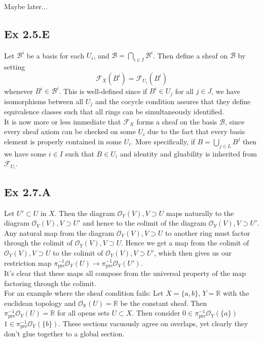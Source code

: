 \documentclass{article}
\theoremstyle{definition}
\newcommand{\R}{\mathbb{R}}
\begin{document}
Maybe later...

\subsection*{Ex 2.5.E}

Let $\mathcal{B}^i$ be a basis for each $U_i$, and $\mathcal{B} = \bigcap_{i
		\in I} \mathcal{B}^i$. Then define a sheaf on $\mathcal{B}$ by setting
\[
	\mathcal{F}_X(B^i) = \mathcal{F}_{U_i}(B^i)
\]
whenever $B^i \in \mathcal{B}^i$. This is well-defined since if $B^i \in U_j$
for all $j \in J$, we have isomorphisms between all $U_j$ and the cocycle
condition assures that they define equivalence classes such that all rings can
be simultaneously identified. \\

It is now more or less immediate that $\mathcal{F}_X$ forms a sheaf on the
basis $\mathcal{B}$, since every sheaf axiom can be checked on some $U_i$ due
to the fact that every basis element is properly contained in some $U_i$. More
specifically, if $B = \bigcup_{j \in L} B^j$ then we have some $i \in I$ such
that $B \in U_i$ and identity and gluability is inherited from
$\mathcal{F}_{U_i}$.


\subsection*{Ex 2.7.A}

Let $U' \subset U$ in $X$. Then the diagram $\mathcal{O}_Y(V), V \supset U$
maps naturally to the diagram $\mathcal{O}_Y(V), V \supset U'$ and hence to the
colimit of the diagram $\mathcal{O}_Y(V), V \supset U'$. Any natural map from
the diagram $\mathcal{O}_Y(V), V \supset U$ to another ring must factor through
the colimit of $\mathcal{O}_Y(V), V \supset U$. Hence we get a map from the
colimit of $\mathcal{O}_Y(V), V \supset U$ to the colimit of $\mathcal{O}_Y(V),
	V \supset U'$, which then gives us our restriction map
$\pi^{-1}_{\text{pre}}\mathcal{O}_Y(U) \to
	\pi^{-1}_{\text{pre}}\mathcal{O}_Y(U')$. \\

It's clear that these maps all compose from the universal property of the map
factoring through the colimit. \\

For an example where the sheaf condition fails: Let $X = \{a, b\}$, $Y = \R$
with the euclidean topology and $\mathcal{O}_{\R}(U) = \R$ be the constant
sheaf. Then $\pi_{\text{pre}}^{-1}\mathcal{O}_{Y}(U) = \R$ for all opens sets
$U \subset X$. Then consider $0 \in
	\pi_{\text{pre}}^{-1}\mathcal{O}_{Y}(\{a\})$ $1 \in
	\pi_{\text{pre}}^{-1}\mathcal{O}_{Y}(\{b\})$. These sections vacuously agree on
overlaps, yet clearly they don't glue together to a global section.
\end{document}
